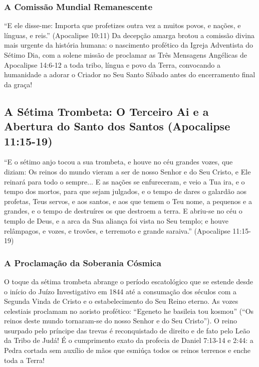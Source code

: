 \documentclass[11pt,a4paper,openany]{book}
\begin{document}
\subsubsection*{A Comissão Mundial Remanescente}
``E ele disse-me: Importa que profetizes outra vez a muitos povos, e nações, e línguas, e reis.'' (Apocalipse 10:11)
Da decepção amarga brotou a comissão divina mais urgente da história humana: o nascimento profético da Igreja Adventista do Sétimo Dia, com a solene missão de proclamar as Três Mensagens Angélicas de Apocalipse 14:6-12 a toda tribo, língua e povo da Terra, convocando a humanidade a adorar o Criador no Seu Santo Sábado antes do encerramento final da graça!



\subsection{A Sétima Trombeta: O Terceiro Ai e a Abertura do Santo dos Santos (Apocalipse 11:15-19)}


``E o sétimo anjo tocou a sua trombeta, e houve no céu grandes vozes, que diziam: Os reinos do mundo vieram a ser de nosso Senhor e do Seu Cristo, e Ele reinará para todo o sempre... E as nações se enfureceram, e veio a Tua ira, e o tempo dos mortos, para que sejam julgados, e o tempo de dares o galardão aos profetas, Teus servos, e aos santos, e aos que temem o Teu nome, a pequenos e a grandes, e o tempo de destruíres os que destroem a terra. E abriu-se no céu o templo de Deus, e a arca da Sua aliança foi vista no Seu templo; e houve relâmpagos, e vozes, e trovões, e terremoto e grande saraiva.'' (Apocalipse 11:15-19)


\subsubsection*{A Proclamação da Soberania Cósmica}
O toque da sétima trombeta abrange o período escatológico que se estende desde o início do Juízo Investigativo em 1844 até a consumação dos séculos com a Segunda Vinda de Cristo e o estabelecimento do Seu Reino eterno.
As vozes celestiais proclamam no aoristo profético: ``Egeneto he basileia tou kosmou'' (``Os reinos deste mundo tornaram-se do nosso Senhor e do Seu Cristo''). O reino usurpado pelo príncipe das trevas é reconquistado de direito e de fato pelo Leão da Tribo de Judá! É o cumprimento exato da profecia de Daniel 7:13-14 e 2:44: a Pedra cortada sem auxílio de mãos que esmiúça todos os reinos terrenos e enche toda a Terra!
\end{document}
